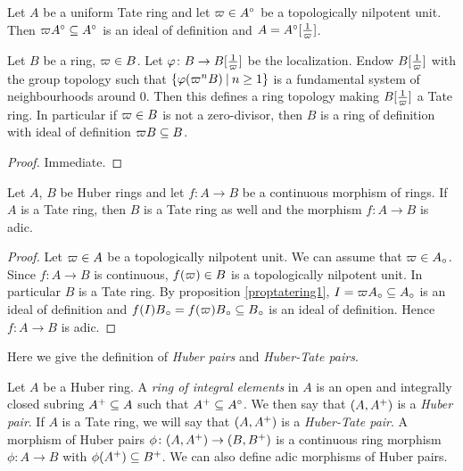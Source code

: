 \begin{cor}\label{cortatering1}
Let $A$ be a uniform Tate ring and let $\varpi\in A{^{\circ}}$ be a topologically nilpotent unit. Then
$\varpi A{^{\circ}}\subseteq A{^{\circ}}$ is an ideal of definition and  $A=A{^{\circ}}[\frac{1}{\varpi}]$.
\end{cor}

\begin{prop}
Let $B$ be a ring, $\varpi\in B$. Let $\varphi\colon B\to B[\frac{1}{\varpi}]$ be the localization. Endow $B[\frac{1}{\varpi}]$ with the group topology such that $\{\varphi(\varpi^n B)\:\vert\: n\geq 1\}$ is a fundamental system of neighbourhoods around 0. Then this defines a ring topology making $B[\frac{1}{\varpi}]$ a Tate ring. In particular if $\varpi\in B$ is not a zero-divisor, then $B$ is a ring of definition with ideal of definition $\varpi B\subseteq B$.
\end{prop}
\begin{proof}
Immediate.
\end{proof}

\begin{prop}
Let $A$, $B$ be Huber rings and let $f\colon A\to B$ be a continuous morphism of rings. If $A$ is a Tate ring, then $B$ is a Tate ring as well and the morphism $f\colon A\to B$ is adic.
\end{prop}
\begin{proof}
Let $\varpi\in A$ be a topologically nilpotent unit. We can assume that $\varpi\in A{_{\circ}}$. Since $f\colon A\to B$ is continuous, $f(\varpi)\in B$ is a topologically nilpotent unit. 
In particular $B$ is a Tate ring.
By proposition \ref{proptatering1}, $I=\varpi A{_{\circ}}\subseteq A{_{\circ}}$ is an ideal of definition and $f(I)B{_{\circ}}=f(\varpi)B{_{\circ}}\subseteq B{_{\circ}}$ is an ideal
of definition.
Hence $f\colon A\to B$ is adic.
\end{proof}
\clearpage


Here we give the definition of \emph{Huber pairs} and \emph{Huber-Tate pairs}.

\begin{definition}
Let $A$ be a Huber ring. A \emph{ring of integral elements} in $A$ is an open and integrally closed subring $A{^{+}}\subseteq A$ such that $A{^{+}}\subseteq A{^{\circ}}$.
We then say that $(A,A{^{+}})$ is a \emph{Huber pair}. If $A$ is a Tate ring, we will say that  $(A,A{^{+}})$ is a \emph{Huber-Tate pair}.
A morphism of Huber pairs $\phi\colon (A, A{^{+}})\to(B, B{^{+}})$ is a continuous ring morphism $\phi\colon A\to B$ with $\phi(A{^{+}})\subseteq B{^{+}}$. We can also define adic morphisms of Huber pairs.
\end{definition}

